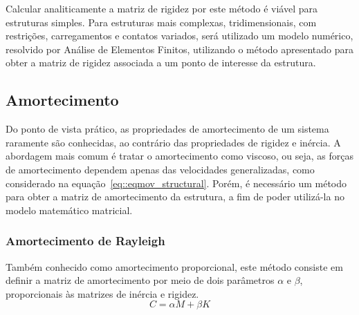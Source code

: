Calcular analiticamente a matriz de rigidez por este método é viável para
estruturas simples. Para estruturas mais complexas, tridimensionais, com
restrições, carregamentos e contatos variados, será utilizado um modelo
numérico, resolvido por Análise de Elementos Finitos, utilizando o método
apresentado para obter a matriz de rigidez associada a um ponto de interesse da
estrutura.


\subsection{Amortecimento} \label{sec::amortecimento}

Do ponto de vista prático, as propriedades de amortecimento de um sistema
raramente são conhecidas, ao contrário das propriedades de rigidez e inércia.
A abordagem mais comum é tratar o amortecimento como viscoso, ou seja, as forças
de amortecimento dependem apenas das velocidades generalizadas, como considerado
na equação~\ref{eq::eqmov_structural}.
Porém, é necessário um método para obter a matriz de amortecimento da estrutura,
a fim de poder utilizá-la no modelo matemático matricial.

\subsubsection{Amortecimento de Rayleigh} \label{sec::amortecimento_revbib}

Também conhecido como amortecimento proporcional, este método consiste em
definir a matriz de amortecimento por meio de dois parâmetros $\alpha$ e
$\beta$, proporcionais às matrizes de inércia e rigidez. 
%
\begin{equation} \label{eq::amort_prop}
	C = \alpha M + \beta K	
\end{equation}
%

